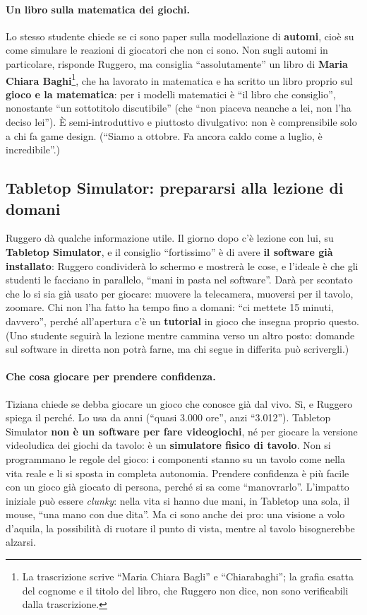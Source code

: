 \paragraph{Un libro sulla matematica dei giochi.} Lo stesso studente chiede se ci sono
paper sulla modellazione di \textbf{automi}, cioè su come simulare le reazioni di
giocatori che non ci sono. Non sugli automi in particolare, risponde Ruggero, ma
consiglia ``assolutamente'' un libro di \textbf{Maria Chiara Baghi}\footnote{La
trascrizione scrive ``Maria Chiara Bagli'' e ``Chiarabaghi''; la grafia esatta del
cognome e il titolo del libro, che Ruggero non dice, non sono verificabili dalla
trascrizione.}, che ha lavorato in matematica e ha scritto un libro proprio sul
\textbf{gioco e la matematica}: per i modelli matematici è ``il libro che
consiglio'', nonostante ``un sottotitolo discutibile'' (che ``non piaceva neanche a
lei, non l'ha deciso lei''). È semi-introduttivo e piuttosto divulgativo: non è
comprensibile solo a chi fa game design. (``Siamo a ottobre. Fa ancora caldo come a
luglio, è incredibile''.)

\subsection{Tabletop Simulator: prepararsi alla lezione di domani}
\label{a7:sec:tut-tts}

Ruggero dà qualche informazione utile. Il giorno dopo c'è lezione con lui, su
\textbf{Tabletop Simulator}, e il consiglio ``fortissimo'' è di avere \textbf{il
software già installato}: Ruggero condividerà lo schermo e mostrerà le cose, e
l'ideale è che gli studenti le facciano in parallelo, ``mani in pasta nel software''.
Darà per scontato che lo si sia già usato per giocare: muovere la telecamera, muoversi
per il tavolo, zoomare. Chi non l'ha fatto ha tempo fino a domani: ``ci mettete 15
minuti, davvero'', perché all'apertura c'è un \textbf{tutorial} in gioco che insegna
proprio questo. (Uno studente seguirà la lezione mentre cammina verso un altro posto:
domande sul software in diretta non potrà farne, ma chi segue in differita può
scrivergli.)

\paragraph{Che cosa giocare per prendere confidenza.} Tiziana chiede se debba
giocare un gioco che conosce già dal vivo. Sì, e Ruggero spiega il perché. Lo usa da
anni (``quasi 3.000 ore'', anzi ``3.012''). Tabletop Simulator \textbf{non è un
software per fare videogiochi}, né per giocare la versione videoludica dei giochi da
tavolo: è un \textbf{simulatore fisico di tavolo}. Non si programmano le regole del
gioco: i componenti stanno su un tavolo come nella vita reale e li si sposta in
completa autonomia. Prendere confidenza è più facile con un gioco già giocato di
persona, perché si sa come ``manovrarlo''. L'impatto iniziale può essere
\emph{clunky}: nella vita si hanno due mani, in Tabletop una sola, il mouse, ``una
mano con due dita''. Ma ci sono anche dei pro: una visione a volo d'aquila, la
possibilità di ruotare il punto di vista, mentre al tavolo bisognerebbe alzarsi.

